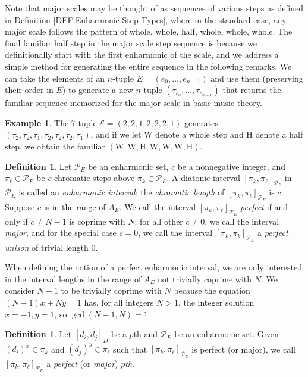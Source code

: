 \documentclass{article}
\theoremstyle{plain}
\theoremstyle{definition}
\newtheorem{definition}[theorem]{Definition}
\newtheorem{example}[theorem]{Example}
\theoremstyle{remark}
\begin{document}
Note that major scales may be thought of as sequences of various steps as defined in Definition \ref{DEF.Enharmonic Step Types}, where in the standard case, any major scale follows the pattern of whole, whole, half, whole, whole, whole. The final familiar half step in the major scale step sequence is  because we definitionally start with the first enharmonic of the scale, and we address a simple method for generating the entire sequence in the following remarks. We can take the elements of an $n$-tuple $E=(e_0,\dots,e_{n-1})$ and use them (preserving their order in $E$) to generate a new $n$-tuple $(\tau_{e_0},\dots,\tau_{e_{n-1}})$ that returns the familiar sequence memorized for the major scale in basic music theory.

\begin{example}
	The $7$-tuple $\mathcal{E}=(2,2,1,2,2,2,1)$ generates $(\tau_2,\tau_2,\tau_1,\tau_2,\tau_2,\tau_2,\tau_1)$, and if we let W denote a whole step and H denote a half step, we obtain the familiar $(\textrm{W},\textrm{W},\textrm{H},\textrm{W},\textrm{W},\textrm{W},\textrm{H})$.
\end{example}

\begin{definition}
\label{DEF.Enharmonic Interval}
	Let $\mathcal{P}_E$ be an enharmonic set, $c$ be a nonnegative integer, and $\pi_\ell\in\mathcal{P}_E$ be $c$ chromatic steps above $\pi_k\in\mathcal{P}_E$. A diatonic interval $[\pi_k,\pi_\ell]_{\mathcal{P}_E}$ in $\mathcal{P}_E$ is called an \textit{enharmonic interval}; the \textit{chromatic length} of $[\pi_k,\pi_\ell]_{\mathcal{P}_E}$ is $c$. Suppose $c$ is in the range of $A_E$. We call the interval $[\pi_k,\pi_\ell]_{\mathcal{P}_E}$ \textit{perfect} if and only if $c\ne N-1$ is coprime with $N$; for all other $c\ne 0$, we call the interval \textit{major}, and for the special case $c=0$, we call the interval $[\pi_k,\pi_k]_{\mathcal{P}_E}$ a \textit{perfect unison} of trivial length $0$.
\end{definition}

When defining the notion of a perfect enharmonic interval, we are only interested in the interval lengths in the range of $A_E$ not trivially coprime with $N$. We consider $N-1$ to be trivially coprime with $N$ because the equation $(N-1)x+Ny=1$ has, for all integers $N>1$, the integer solution $x=-1,y=1$, so $\gcd{(N-1,N)}=1$ \cite{Bezout}.

\begin{definition}
\label{DEF.Perfect and Major pth}
	Let $[d_i,d_j]_D$ be a $p$th and $\mathcal{P}_E$ be an enharmonic set. Given $(d_i)^x\in\pi_k$ and $(d_j)^y\in\pi_\ell$ such that $[\pi_k,\pi_\ell]_{\mathcal{P}_E}$ is perfect (or major), we call $[\pi_k,\pi_\ell]_{\mathcal{P}_E}$ a \textit{perfect} (or \textit{major}) \textit{$p$th}.
\end{definition}
\end{document}
